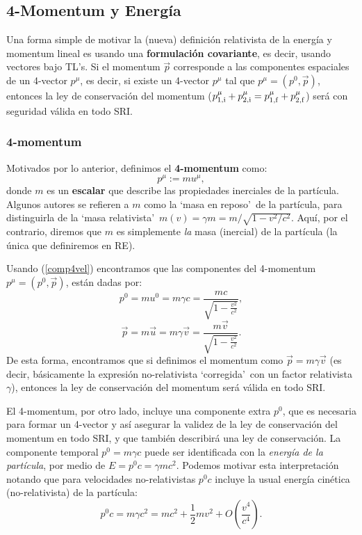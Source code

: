 \subsection{4-Momentum y Energía}

Una forma simple de motivar la (nueva) definición relativista de la energía y momentum lineal es usando una \textbf{formulación covariante}, es decir, usando vectores bajo TL's. Si el
momentum $\vec{p}$ corresponde a las componentes espaciales de un 4-vector
$p^\mu$, es decir, si existe un 4-vector $p^\mu$ tal que $p^\mu=(p^0,\vec{p})$, entonces la ley de conservación del momentum
($p^\mu_{\rm 1,i}+p^\mu_{2,\rm i}=p^\mu_{1,\rm f}+p^\mu_{2,\rm f}$) será con seguridad válida en
todo SRI.

\subsubsection{4-momentum}
Motivados por lo anterior, definimos el \textbf{4-momentum} como:
\begin{equation}
\boxed{p^\mu :=mu^\mu, \label{def4mom}}
\end{equation}
donde $m$ es un \textbf{escalar} que describe las propiedades inerciales de la
partícula. Algunos autores se refieren a $m$ como la `masa en reposo'\ de la
partícula, para distinguirla de la `masa relativista'\ $m(v)=\gamma
m={m}/{\sqrt{1-{v^2}/{c^2}}}$. Aquí, por el contrario, diremos que $m$
es simplemente \textit{la} masa (inercial) de la partícula (la única que
definiremos en RE).

Usando (\ref{comp4vel}) encontramos que las componentes del 4-momentum
$p^\mu=(p^0,\vec{p})$, están dadas por:
\begin{equation}
\boxed{p^0=m u^0=m\gamma c=\frac{mc}{\sqrt{1-\frac{v^2}{c^2}}}},
\end{equation}
\begin{equation}
\boxed{\vec{p}=m \vec{u}=m\gamma \vec{v}=\frac{m\vec{v}}{\sqrt{1-\frac{v^2}{c^2}}}.}
\end{equation}
De esta forma, encontramos que si definimos el momentum como
$\vec{p}=m\gamma\vec{v}$ (es decir, básicamente la expresión no-relativista
`corregida'\ con un factor relativista $\gamma$), entonces la ley de
conservación del momentum será válida en todo SRI.

El 4-momentum, por otro lado, incluye una componente extra $p^0$, que es
necesaria para formar un 4-vector y así asegurar la validez de la ley de
conservación del momentum en todo SRI, y que también describirá una ley de
conservación. La componente temporal $p^0=m\gamma c$ puede ser identificada
con la \textit{energía de la partícula}, por medio de $E=p^0 c=\gamma mc^2$.
Podemos motivar esta interpretación notando que para velocidades
no-relativistas $p^0 c$ incluye la usual energía cinética (no-relativista) de
la partícula:
\begin{equation}
p^0c=m\gamma c^2=mc^2+\frac{1}{2}mv^2+O(\frac{v^4}{c^4}).
\end{equation}

